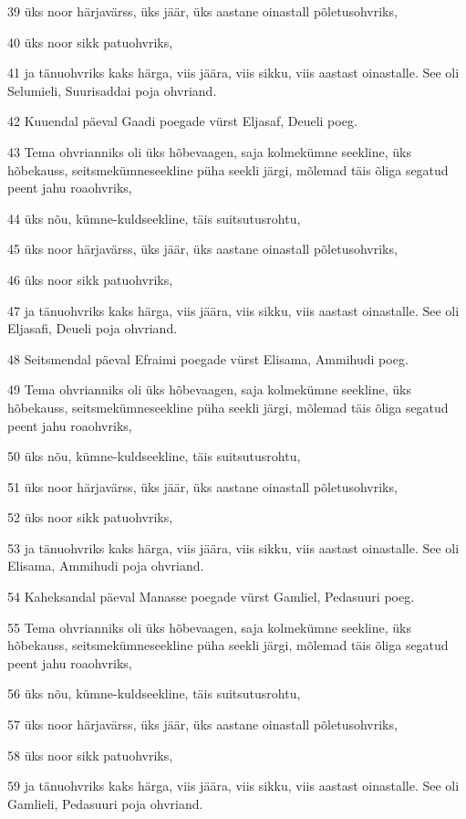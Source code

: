 \par 39 üks noor härjavärss, üks jäär, üks aastane oinastall põletusohvriks,
\par 40 üks noor sikk patuohvriks,
\par 41 ja tänuohvriks kaks härga, viis jäära, viis sikku, viis aastast oinastalle. See oli Selumieli, Suurisaddai poja ohvriand.
\par 42 Kuuendal päeval Gaadi poegade vürst Eljasaf, Deueli poeg.
\par 43 Tema ohvrianniks oli üks hõbevaagen, saja kolmekümne seekline, üks hõbekauss, seitsmekümneseekline püha seekli järgi, mõlemad täis õliga segatud peent jahu roaohvriks,
\par 44 üks nõu, kümne-kuldseekline, täis suitsutusrohtu,
\par 45 üks noor härjavärss, üks jäär, üks aastane oinastall põletusohvriks,
\par 46 üks noor sikk patuohvriks,
\par 47 ja tänuohvriks kaks härga, viis jäära, viis sikku, viis aastast oinastalle. See oli Eljasafi, Deueli poja ohvriand.
\par 48 Seitsmendal päeval Efraimi poegade vürst Elisama, Ammihudi poeg.
\par 49 Tema ohvrianniks oli üks hõbevaagen, saja kolmekümne seekline, üks hõbekauss, seitsmekümneseekline püha seekli järgi, mõlemad täis õliga segatud peent jahu roaohvriks,
\par 50 üks nõu, kümne-kuldseekline, täis suitsutusrohtu,
\par 51 üks noor härjavärss, üks jäär, üks aastane oinastall põletusohvriks,
\par 52 üks noor sikk patuohvriks,
\par 53 ja tänuohvriks kaks härga, viis jäära, viis sikku, viis aastast oinastalle. See oli Elisama, Ammihudi poja ohvriand.
\par 54 Kaheksandal päeval Manasse poegade vürst Gamliel, Pedasuuri poeg.
\par 55 Tema ohvrianniks oli üks hõbevaagen, saja kolmekümne seekline, üks hõbekauss, seitsmekümneseekline püha seekli järgi, mõlemad täis õliga segatud peent jahu roaohvriks,
\par 56 üks nõu, kümne-kuldseekline, täis suitsutusrohtu,
\par 57 üks noor härjavärss, üks jäär, üks aastane oinastall põletusohvriks,
\par 58 üks noor sikk patuohvriks,
\par 59 ja tänuohvriks kaks härga, viis jäära, viis sikku, viis aastast oinastalle. See oli Gamlieli, Pedasuuri poja ohvriand.

